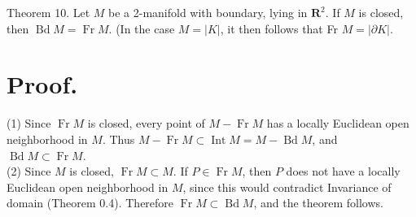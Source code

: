 Theorem 10. Let $M$ be a 2-manifold with boundary, lying in $\mathbf{R}^{2}$. If $M$ is closed, then $\operatorname{Bd} M=\operatorname{Fr} M$. (In the case $M=|K|$, it then follows that Fr $M=|\partial K|$.

\section*{Proof.}
(1) Since $\operatorname{Fr} M$ is closed, every point of $M-\operatorname{Fr} M$ has a locally Euclidean open neighborhood in $M$. Thus $M-\operatorname{Fr} M \subset \operatorname{Int} M=M- \operatorname{Bd} M$, and $\operatorname{Bd} M \subset \operatorname{Fr} M$.\\
(2) Since $M$ is closed, $\operatorname{Fr} M \subset M$. If $P \in \operatorname{Fr} M$, then $P$ does not have a locally Euclidean open neighborhood in $M$, since this would contradict Invariance of domain (Theorem 0.4). Therefore $\operatorname{Fr} M \subset \operatorname{Bd} M$, and the theorem follows.
